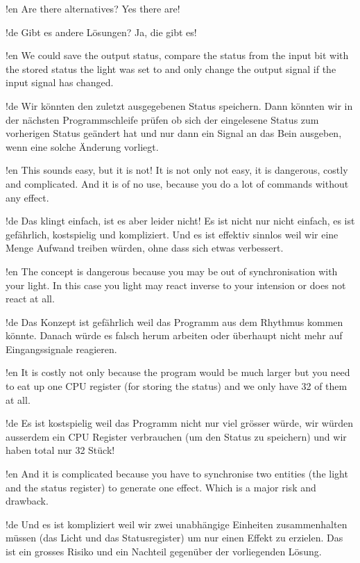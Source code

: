 !en Are there alternatives? Yes there are!

!de Gibt es andere Lösungen? Ja, die gibt es!



!en We could save the output status, compare the status from the input bit with the stored status the light was set to and only change the output signal if the input signal has changed.

!de Wir könnten den zuletzt ausgegebenen Status speichern. Dann könnten wir in der nächsten Programmschleife prüfen ob sich der eingelesene Status zum vorherigen Status geändert hat und nur dann ein Signal an das Bein ausgeben, wenn eine solche Änderung vorliegt.



!en This sounds easy, but it is not! It is not only not easy, it is dangerous, costly and complicated. And it is of no use, because you do a lot of commands without any effect.

!de Das klingt einfach, ist es aber leider nicht! Es ist nicht nur nicht einfach, es ist gefährlich, kostspielig und kompliziert. Und es ist effektiv sinnlos weil wir eine Menge Aufwand treiben würden, ohne dass sich etwas verbessert.



!en The concept is dangerous because you may be out of synchronisation with your light. In this case you light may react inverse to your intension or does not react at all.

!de Das Konzept ist gefährlich weil das Programm aus dem Rhythmus kommen könnte. Danach würde es falsch herum arbeiten oder überhaupt nicht mehr auf Eingangssignale reagieren.



!en It is costly not only because the program would be much larger but you need to eat up one CPU register (for storing the status) and we only have 32 of them at all.

!de Es ist kostspielig weil das Programm nicht nur viel grösser würde, wir würden ausserdem ein CPU Register verbrauchen (um den Status zu speichern) und wir haben total nur 32 Stück!



!en And it is complicated because you have to synchronise two entities (the light and the status register) to generate one effect. Which is a major risk and drawback.

!de Und es ist kompliziert weil wir zwei unabhängige Einheiten zusammenhalten müssen (das Licht und das Statusregister) um nur einen Effekt zu erzielen. Das ist ein grosses Risiko und ein Nachteil gegenüber der vorliegenden Lösung.



